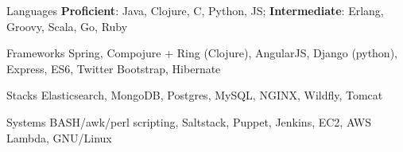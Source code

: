 
\begin{cvskills}

  \cvskill
    {Languages} %
    {\textbf{Proficient}: Java, Clojure, C, Python, JS; \textbf{Intermediate}: Erlang, Groovy, Scala, Go, Ruby} %

  \cvskill
    {Frameworks} %
    {Spring, Compojure + Ring (Clojure), AngularJS, Django (python), Express, ES6, Twitter Bootstrap, Hibernate} %

  \cvskill
    {Stacks} %
    {Elasticsearch, MongoDB, Postgres, MySQL, NGINX, Wildfly, Tomcat} %
    
  \cvskill
    {Systems} %
    {BASH/awk/perl scripting, Saltstack, Puppet, Jenkins, EC2, AWS Lambda, GNU/Linux} %

\end{cvskills}
